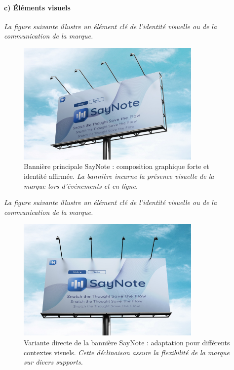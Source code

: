 \paragraph*{c) Éléments visuels}
\noindent
\textit{La figure suivante illustre un élément clé de l'identité visuelle ou de la communication de la marque.}
\begin{figure}[H]
    \centering
    \includegraphics[width=0.8\textwidth]{docs/visual-indentity/pictures/big-banner.jpg}
    \caption{Bannière principale SayNote : composition graphique forte et identité affirmée. \newline\textit{La bannière incarne la présence visuelle de la marque lors d'événements et en ligne.}}
\end{figure}
\noindent
\textit{La figure suivante illustre un élément clé de l'identité visuelle ou de la communication de la marque.}
\begin{figure}[H]
    \centering
    \includegraphics[width=0.8\textwidth]{docs/visual-indentity/pictures/big-banner-directly .jpg}
    \caption{Variante directe de la bannière SayNote : adaptation pour différents contextes visuels. \newline\textit{Cette déclinaison assure la flexibilité de la marque sur divers supports.}}
\end{figure}

